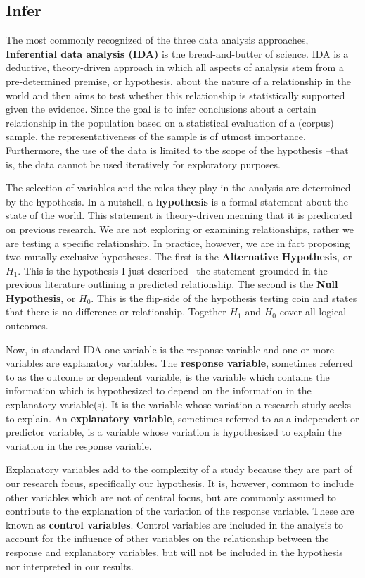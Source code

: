 \documentclass[
  letterpaper,
  DIV=11,
  numbers=noendperiod]{scrreprt}
\theoremstyle{definition}
\theoremstyle{remark}
\begin{document}
\subsection{Infer}\label{sec-aa-infer}

The most commonly recognized of the three data analysis approaches,
\textbf{Inferential data analysis (IDA)} is the bread-and-butter of
science. IDA is a deductive, theory-driven approach in which all aspects
of analysis stem from a pre-determined premise, or hypothesis, about the
nature of a relationship in the world and then aims to test whether this
relationship is statistically supported given the evidence. Since the
goal is to infer conclusions about a certain relationship in the
population based on a statistical evaluation of a (corpus) sample, the
representativeness of the sample is of utmost importance. Furthermore,
the use of the data is limited to the scope of the hypothesis --that is,
the data cannot be used iteratively for exploratory purposes.

The selection of variables and the roles they play in the analysis are
determined by the hypothesis. In a nutshell, a \textbf{hypothesis} is a
formal statement about the state of the world. This statement is
theory-driven meaning that it is predicated on previous research. We are
not exploring or examining relationships, rather we are testing a
specific relationship. In practice, however, we are in fact proposing
two mutally exclusive hypotheses. The first is the \textbf{Alternative
Hypothesis}, or \(H_1\). This is the hypothesis I just described --the
statement grounded in the previous literature outlining a predicted
relationship. The second is the \textbf{Null Hypothesis}, or \(H_0\).
This is the flip-side of the hypothesis testing coin and states that
there is no difference or relationship. Together \(H_1\) and \(H_0\)
cover all logical outcomes.

Now, in standard IDA one variable is the response variable and one or
more variables are explanatory variables. The \textbf{response
variable}, sometimes referred to as the outcome or dependent variable,
is the variable which contains the information which is hypothesized to
depend on the information in the explanatory variable(s). It is the
variable whose variation a research study seeks to explain. An
\textbf{explanatory variable}, sometimes referred to as a independent or
predictor variable, is a variable whose variation is hypothesized to
explain the variation in the response variable.

Explanatory variables add to the complexity of a study because they are
part of our research focus, specifically our hypothesis. It is, however,
common to include other variables which are not of central focus, but
are commonly assumed to contribute to the explanation of the variation
of the response variable. These are known as \textbf{control variables}.
Control variables are included in the analysis to account for the
influence of other variables on the relationship between the response
and explanatory variables, but will not be included in the hypothesis
nor interpreted in our results.
\end{document}
